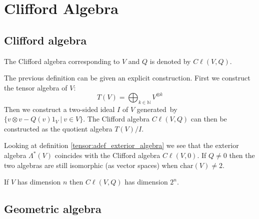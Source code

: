 \chapter{Clifford Algebra}

\section{Clifford algebra}

	\begin{notation}
		The Clifford algebra corresponding to $V$ and $Q$ is denoted by $C\ell(V, Q)$.
	\end{notation}
	
	\begin{construct}
		The previous definition can be given an explicit construction. First we construct the tensor algebra of $V$:
		\begin{equation}
			T(V) = \bigoplus_{k\in\mathbb{N}}V^{\otimes k}
		\end{equation}
		Then we construct a two-sided ideal $I$ of $V$ generated\footnotemark\ by $\{v\otimes v - Q(v)1_V\ |\ v\in V\}$. The Clifford algebra $C\ell(V, Q)$ can then be constructed as the quotient algebra $T(V)/I$.
	\end{construct}
	
	\begin{remark}
		Looking at definition \ref{tensor:adef_exterior_algebra} we see that the exterior algebra $\Lambda^*(V)$ coincides with the Clifford algebra $C\ell(V, 0)$. If $Q\neq0$ then the two algebras are still isomorphic (as vector spaces) when $\text{char}(V)\neq2$.
	\end{remark}
	
	\begin{property}[Dimension]
		If $V$ has dimension $n$ then $C\ell(V, Q)$ has dimension $2^n$.	
	\end{property}
	
\section{Geometric algebra}

